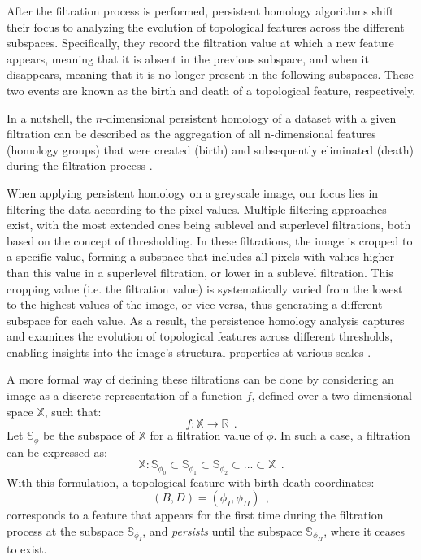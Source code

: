 After the filtration process is performed, persistent homology algorithms shift their focus to analyzing the evolution of topological features across the different subspaces. Specifically, they record the filtration value at which a new feature appears, meaning that it is absent in the previous subspace, and when it disappears, meaning that it is no longer present in the following subspaces. These two events are known as the birth and death of a topological feature, respectively. 

In a nutshell, the $n$-dimensional persistent homology of a dataset with a given filtration can be described as the aggregation of all n-dimensional features (homology groups) that were created (birth) and subsequently eliminated (death) during the filtration process \citep{ph_filtration}.

When applying persistent homology on a greyscale image, our focus lies in filtering the data according to the pixel values. Multiple filtering approaches exist, with the most extended ones being sublevel and superlevel filtrations, both based on the concept of thresholding. In these filtrations, the image is cropped to a specific value, forming a subspace that includes all pixels with values higher than this value in a superlevel filtration, or lower in a sublevel filtration. This cropping value (i.e. the filtration value) is systematically varied from the lowest to the highest values of the image, or vice versa, thus generating a different subspace for each value. As a result, the persistence homology analysis captures and examines the evolution of topological features across different thresholds, enabling insights into the image's structural properties at various scales \citep{ph_image_filtration}.

A more formal way of defining these filtrations can be done by considering an image as a discrete representation of a function $f$, defined over a two-dimensional space $\mathbb{X}$, such that: 
\begin{equation}
    f :  \mathbb{X} \longrightarrow  \mathbb{R} \ \ .
\end{equation}
Let $\mathbb{S} _\phi$ be the subspace of $\mathbb{X}$ for a filtration value of $\phi$. In such a case, a filtration can be expressed as:
\begin{equation}
    \mathbb{X}: \mathbb{S}_{\phi_0} \subset \mathbb{S}_{\phi_1} \subset \mathbb{S}_{\phi_2}\subset... \subset \mathbb{X}\ \ .
\end{equation}
With this formulation, a topological feature with birth-death coordinates:
\begin{equation}
(B, D) = (\phi_ I, \phi _ {II}) \ \ ,
\end{equation} 
corresponds to a feature that appears for the first time during the filtration process at the subspace $\mathbb{S}_{\phi _ I}$, and \textit{persists} until the subspace $\mathbb{S}_{\phi _ {II}}$, where it ceases to exist.

